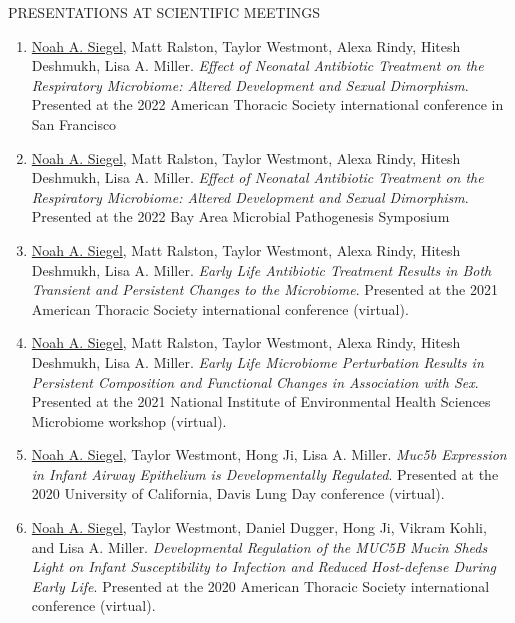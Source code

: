 \documentclass{resume} %
\begin{document}
\begin{rSection}{PRESENTATIONS AT SCIENTIFIC MEETINGS}
\begin{enumerate}
\item \underline{Noah A. Siegel}, Matt Ralston, Taylor Westmont, Alexa Rindy, Hitesh Deshmukh, Lisa A. Miller. \emph{Effect of Neonatal Antibiotic Treatment on the Respiratory Microbiome: Altered Development and Sexual Dimorphism}. Presented at the 2022 American Thoracic Society international conference in San Francisco

\item \underline{Noah A. Siegel}, Matt Ralston, Taylor Westmont, Alexa Rindy, Hitesh Deshmukh, Lisa A. Miller. \emph{Effect of Neonatal Antibiotic Treatment on the Respiratory Microbiome: Altered Development and Sexual Dimorphism}. Presented at the 2022 Bay Area Microbial Pathogenesis Symposium

\item \underline{Noah A. Siegel}, Matt Ralston, Taylor Westmont, Alexa Rindy, Hitesh Deshmukh, Lisa A. Miller. \emph{Early Life Antibiotic Treatment Results in Both Transient and Persistent Changes to the Microbiome}. Presented at the 2021 American Thoracic Society international conference (virtual).

\item \underline{Noah A. Siegel}, Matt Ralston, Taylor Westmont, Alexa Rindy, Hitesh Deshmukh, Lisa A. Miller. \emph{Early Life Microbiome Perturbation Results in Persistent Composition and Functional Changes in Association with Sex}. Presented at the 2021 National Institute of Environmental Health Sciences Microbiome workshop (virtual).

\item \underline{Noah A. Siegel}, Taylor Westmont, Hong Ji, Lisa A. Miller. \emph{Muc5b Expression in Infant Airway Epithelium is Developmentally Regulated}. Presented at the 2020 University of California, Davis Lung Day conference (virtual).

\item \underline{Noah A. Siegel}, Taylor Westmont, Daniel Dugger, Hong Ji, Vikram Kohli, and Lisa A. Miller. \emph{Developmental Regulation of the MUC5B Mucin Sheds Light on Infant Susceptibility to Infection and Reduced Host-defense During Early Life}. Presented at the 2020 American Thoracic Society international conference (virtual).

\end{enumerate}
\end{rSection}
\end{document}
